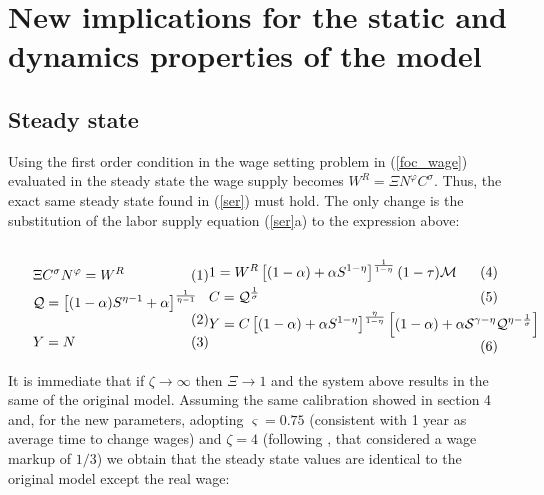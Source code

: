 \documentclass{article}
\begin{document}
\section{New implications for the static and dynamics properties of the model}

\subsection{Steady state}
Using the first order condition in the wage setting problem in (\ref{foc_wage}) evaluated in the steady state the wage supply becomes $W^R = \Xi N^\varphi C^\sigma$. Thus, the exact same steady state found in (\ref{ser}) must hold. The only change is the substitution of the labor supply equation (\ref{ser}a) to the expression above:

\begin{subequations}
    \label{ser_wage}
    \begin{minipage}{0.39\textwidth}
        \begin{align}
            & \Xi C^\sigma N^\varphi = W^R \\
            &\mathcal{Q} = \left[(1-\alpha)S^{\eta-1} + \alpha \right]^{\frac{1}{\eta-1}}\\
            &Y =  N
        \end{align}
    \end{minipage}
    \begin{minipage}{0.6\textwidth}
        \begin{align}
            &1 = W^R \left[(1-\alpha) + \alpha S^{1-\eta} \right]^{\frac{1}{1-\eta}} (1 - \tau) \mathcal M\\
            &C = \mathcal Q^{\frac{1}{\sigma}}\\
            &Y = C \left[(1-\alpha) + \alpha S^{1-\eta} \right]^{\frac{\eta}{1-\eta}} \left[(1-\alpha)  +  \alpha \mathcal S^{\gamma - \eta} \mathcal Q^{\eta - \frac{1}{\sigma}} \right]
        \end{align}
    \end{minipage}
\end{subequations}

\vspace{6pt}

It is immediate that if $\zeta \to \infty$ then $\Xi \to 1$ and the system above results in the same of the original model. Assuming the same calibration showed in section 4 and, for the new parameters, adopting $\varsigma = 0.75$ (consistent with 1 year as average time to change wages) and $\zeta = 4$ (following \cite{erceg}, that considered a wage markup of $1/3$) we obtain that the steady state values are identical to the original model except the real wage:
\end{document}
